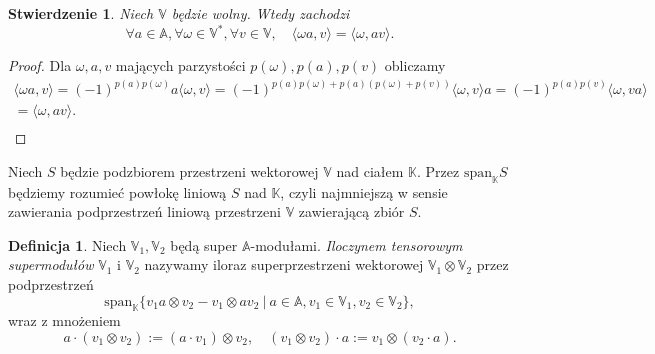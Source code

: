 \documentclass[11pt,a4paper]{report}
\newtheorem{proposition}[theorem]{Stwierdzenie}
\theoremstyle{definition}
\newtheorem{definition}[theorem]{Definicja}
\begin{document}
\begin{proposition}
Niech $\mathbb{V}$ będzie wolny. Wtedy zachodzi
\begin{equation}
\label{supertransposition_component01}
\forall a \in \mathbb{A}, \forall\omega \in \mathbb{V}^*, \forall v \in \mathbb{V}, \quad \langle \omega a, v \rangle = \langle \omega , a v \rangle.
\end{equation}
\end{proposition}

\begin{proof}
 Dla $\omega, a, v$ mających parzystości $p(\omega), p(a), p(v)$ obliczamy 
 \begin{equation*}
 \begin{gathered}
 \langle \omega a , v \rangle = (-1)^{p(a)p(\omega)}a \langle \omega, v \rangle = (-1)^{p(a)p(\omega) + p(a)(p(\omega) + p(v))} \langle \omega, v \rangle a = (-1)^{p(a)p(v)} \langle \omega, v a\rangle \\ = \langle \omega, av \rangle. \\[-30pt]
 \end{gathered}
 \end{equation*}
\end{proof}

Niech $S$ będzie podzbiorem przestrzeni wektorowej $\mathbb{V}$ nad ciałem $\mathbb{K}$. Przez $\mathrm{span}_\mathbb{K} S$ będziemy rozumieć powłokę liniową $S$ nad $\mathbb{K}$, czyli najmniejszą w sensie zawierania podprzestrzeń liniową przestrzeni $\mathbb{V}$ zawierającą zbiór $S$.

\begin{definition}
\label{def:tensor_supermodule}
 Niech $\mathbb{V}_1, \mathbb{V}_2$ będą super $\mathbb{A}$-modułami. \textit{Iloczynem tensorowym supermodułów} $\mathbb{V}_1$ i $\mathbb{V}_2$ nazywamy iloraz superprzestrzeni wektorowej $\mathbb{V}_1 \otimes \mathbb{V}_2$ przez podprzestrzeń
 \begin{equation*}
  \mathrm{span}_\mathbb{K} \{ v_1 a \otimes v_2 - v_1 \otimes a v_2\ |\ a \in \mathbb{A}, v_1 \in \mathbb{V}_1, v_2 \in \mathbb{V}_2 \},
 \end{equation*}
 wraz z mnożeniem
 \begin{equation*}
  a \cdot \left( v_1 \otimes v_2 \right) := (a \cdot v_1) \otimes v_2, \quad \left( v_1 \otimes v_2 \right) \cdot a := v_1 \otimes (v_2 \cdot a).
 \end{equation*}
\end{definition}
\end{document}
